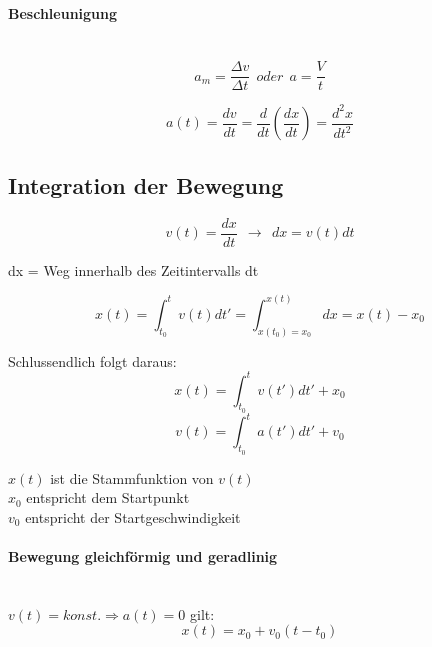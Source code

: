 \documentclass[7pt]{article}
\begin{document}
\begin{multicols*}{3}
\paragraph{Beschleunigung}\mbox{} \\
\begin{equation*}
	a_m = \frac{{\Delta}v}{{\Delta}t} \>\>oder\>\> a = \frac{V}{t}
\end{equation*}

\begin{equation*}
a(t) = \frac{dv}{dt} = \frac{d}{dt} \left(\frac{dx}{dt}\right) = \frac{d^2x}{dt^2}
\end{equation*}


\subsection{Integration der Bewegung}
\begin{equation*}
	v(t) = \frac{dx}{dt} \>\> \rightarrow \>\> dx = v(t)dt
\end{equation*}
\begin{center}
dx =  Weg innerhalb des Zeitintervalls dt\newline
\end{center}

\begin{equation*}
	x(t) = \int_{t_0}^{t}v(t)dt' = \int_{x(t_0)=x_0}^{x(t)}dx = x(t) - x_0
\end{equation*}
\newline

Schlussendlich folgt daraus:
\begin{equation*}
	x(t) = \int_{t_0}^{t}v(t')dt' + x_0
\end{equation*}
\begin{equation*}
	v(t) = \int_{t_0}^{t}a(t')dt' + v_0
\end{equation*}

$x(t)$ ist die Stammfunktion von $v(t)$ \\
$x_0$ entspricht dem Startpunkt \\
$v_0$ entspricht der Startgeschwindigkeit\newline

\paragraph{Bewegung gleichf{\"o}rmig und geradlinig}\mbox{} \\
$v(t) = konst. \Rightarrow a(t) = 0$ gilt:\newline
\begin{equation*}
	x(t) = x_0 + v_0(t - t_0)
\end{equation*}

\end{multicols*}
\end{document}
